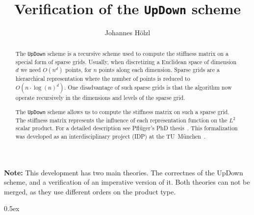 \documentclass[11pt,a4paper]{article}
\title{Verification of the \texttt{UpDown} scheme}
\author{Johannes H{\"o}lzl}
\begin{document}
\maketitle

\begin{abstract}

The \texttt{UpDown} scheme is a recursive scheme used to compute the stiffness matrix on a special form of
sparse grids. Usually, when discretizing a Euclidean space of dimension $d$ we need $O(n^d)$ points,
for $n$ points along each dimension. Sparse grids are a hierarchical representation where the number
of points is reduced to $O(n\cdot\log(n)^d)$. One disadvantage of such sparse grids is that the
algorithm now operate recursively in the dimensions and levels of the sparse grid.

The \texttt{UpDown} scheme allows us to compute the stiffness matrix on such a sparse grid. The stiffness
matrix represents the influence of each representation function on the $L^2$ scalar product.
For a detailed description see Pfl{\"u}ger's PhD thesis~\cite{pflueger10spatially}. This formalization
was developed as an interdisciplinary project (IDP) at the TU~M{\"u}nchen~\cite{hoelzl09updown}.

\end{abstract}

\textbf{Note:} This development has two main theories. The correctnes of the UpDown scheme, and
a verification of an imperative version of it. Both theories can not be merged, as they use
different orders on the product type.

\tableofcontents

\parindent 0pt\parskip 0.5ex





\end{document}

